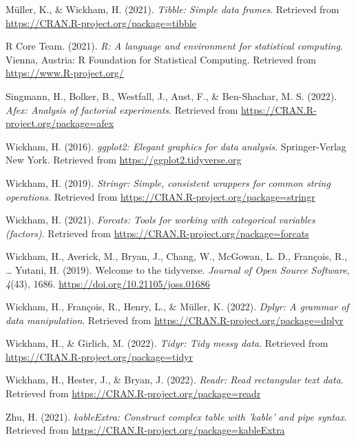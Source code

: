 \documentclass[
  man]{apa6}
\newlength{\cslhangindent}
\newlength{\cslentryspacingunit} %
\newenvironment{CSLReferences}[2] %
 {%
  \setlength{\parindent}{0pt}
  \ifodd #1
  \let\oldpar\par
  \def\par{\hangindent=\cslhangindent\oldpar}
  \fi
  \setlength{\parskip}{#2\cslentryspacingunit}
 }%
 {}
\begin{document}
\begin{CSLReferences}{1}{0}
\leavevmode{}%
Müller, K., \& Wickham, H. (2021). \emph{Tibble: Simple data frames}. Retrieved from \url{https://CRAN.R-project.org/package=tibble}

\leavevmode{}%
R Core Team. (2021). \emph{R: A language and environment for statistical computing}. Vienna, Austria: R Foundation for Statistical Computing. Retrieved from \url{https://www.R-project.org/}

\leavevmode{}%
Singmann, H., Bolker, B., Westfall, J., Aust, F., \& Ben-Shachar, M. S. (2022). \emph{Afex: Analysis of factorial experiments}. Retrieved from \url{https://CRAN.R-project.org/package=afex}

\leavevmode{}%
Wickham, H. (2016). \emph{ggplot2: Elegant graphics for data analysis}. Springer-Verlag New York. Retrieved from \url{https://ggplot2.tidyverse.org}

\leavevmode{}%
Wickham, H. (2019). \emph{Stringr: Simple, consistent wrappers for common string operations}. Retrieved from \url{https://CRAN.R-project.org/package=stringr}

\leavevmode{}%
Wickham, H. (2021). \emph{Forcats: Tools for working with categorical variables (factors)}. Retrieved from \url{https://CRAN.R-project.org/package=forcats}

\leavevmode{}%
Wickham, H., Averick, M., Bryan, J., Chang, W., McGowan, L. D., François, R., \ldots{} Yutani, H. (2019). Welcome to the {tidyverse}. \emph{Journal of Open Source Software}, \emph{4}(43), 1686. \url{https://doi.org/10.21105/joss.01686}

\leavevmode{}%
Wickham, H., François, R., Henry, L., \& Müller, K. (2022). \emph{Dplyr: A grammar of data manipulation}. Retrieved from \url{https://CRAN.R-project.org/package=dplyr}

\leavevmode{}%
Wickham, H., \& Girlich, M. (2022). \emph{Tidyr: Tidy messy data}. Retrieved from \url{https://CRAN.R-project.org/package=tidyr}

\leavevmode{}%
Wickham, H., Hester, J., \& Bryan, J. (2022). \emph{Readr: Read rectangular text data}. Retrieved from \url{https://CRAN.R-project.org/package=readr}

\leavevmode{}%
Zhu, H. (2021). \emph{kableExtra: Construct complex table with 'kable' and pipe syntax}. Retrieved from \url{https://CRAN.R-project.org/package=kableExtra}

\end{CSLReferences}

\endgroup
\end{document}
